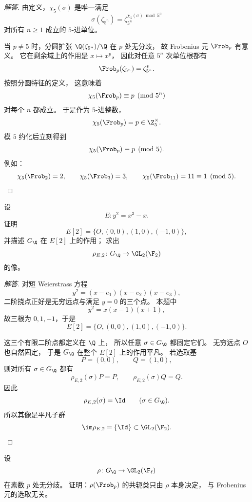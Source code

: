 \begin{proof}[解答]
由定义，$\chi_5(\sigma)$ 是唯一满足
\[
  \sigma(\zeta_{5^n})=\zeta_{5^n}^{\chi_5(\sigma)\bmod 5^n}
\]
对所有 $n\ge 1$ 成立的 $5$-进单位。

当 $p\neq 5$ 时，分圆扩张 $\Q(\zeta_{5^n})/\Q$ 在 $p$ 处无分歧，
故 Frobenius 元 $\Frob_p$ 有意义。
它在剩余域上的作用是 $x\mapsto x^p$，
因此对任意 $5^n$ 次单位根都有
\[
  \Frob_p(\zeta_{5^n})=\zeta_{5^n}^p.
\]
按照分圆特征的定义，
这意味着
\[
  \chi_5(\Frob_p)\equiv p\pmod{5^n}
\]
对每个 $n$ 都成立。
于是作为 $5$-进整数，
\[
  \chi_5(\Frob_p)=p\in \Z_5^\times.
\]
模 $5$ 约化后立刻得到
\[
  \chi_5(\Frob_p)\equiv p\pmod 5.
\]
例如：
\[
  \chi_5(\Frob_2)=2,
  \qquad
  \chi_5(\Frob_3)=3,
  \qquad
  \chi_5(\Frob_{11})=11\equiv 1\pmod 5.
\]
\end{proof}

\begin{exercise}
设
\[
  E\colon y^2=x^3-x.
\]
证明
\[
  E[2]=\{O,(0,0),(1,0),(-1,0)\},
\]
并描述 $G_\Q$ 在 $E[2]$ 上的作用；
求出
\[
  \rho_{E,2}\colon G_\Q\to \GL_2(\F_2)
\]
的像。
\end{exercise}

\begin{proof}[解答]
对短 Weierstrass 方程
\[
  y^2=(x-e_1)(x-e_2)(x-e_3),
\]
二阶挠点正好是无穷远点与满足 $y=0$ 的三个点。
本题中
\[
  y^2=x(x-1)(x+1),
\]
故三根为 $0,1,-1$，于是
\[
  E[2]=\{O,(0,0),(1,0),(-1,0)\}.
\]

这三个有限二阶点都定义在 $\Q$ 上，
所以任意 $\sigma\in G_\Q$ 都固定它们。
无穷远点 $O$ 也自然固定，
于是 $G_\Q$ 在整个 $E[2]$ 上的作用平凡。
若选取基
\[
  P=(0,0),
  \qquad Q=(1,0),
\]
则对所有 $\sigma\in G_\Q$ 都有
\[
  \rho_{E,2}(\sigma)P=P,
  \qquad
  \rho_{E,2}(\sigma)Q=Q.
\]
因此
\[
  \rho_{E,2}(\sigma)=\Id
  \qquad (\sigma\in G_\Q).
\]
所以其像是平凡子群
\[
  \im\rho_{E,2}=\{\Id\}\subset \GL_2(\F_2).
\]
\end{proof}

\begin{exercise}
设
\[
  \rho\colon G_\Q\to \GL_2(\F_\ell)
\]
在素数 $p$ 处无分歧。
证明：$\rho(\Frob_p)$ 的共轭类只由 $\rho$ 本身决定，
与 Frobenius 元的选取无关。
\end{exercise}

